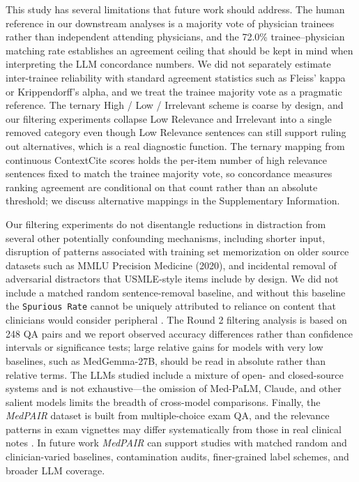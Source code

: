 \documentclass[fleqn,10pt]{wlscirep}
\def\ourmetric{\texttt{Spurious Rate}\xspace}
\begin{document}
This study has several limitations that future work should address. The human reference in our downstream analyses is a majority vote of physician trainees rather than independent attending physicians, and the 72.0\% trainee--physician matching rate establishes an agreement ceiling that should be kept in mind when interpreting the LLM concordance numbers. We did not separately estimate inter-trainee reliability with standard agreement statistics such as Fleiss' kappa or Krippendorff's alpha, and we treat the trainee majority vote as a pragmatic reference. The ternary High / Low / Irrelevant scheme is coarse by design, and our filtering experiments collapse Low Relevance and Irrelevant into a single removed category even though Low Relevance sentences can still support ruling out alternatives, which is a real diagnostic function. The ternary mapping from continuous ContextCite scores holds the per-item number of high relevance sentences fixed to match the trainee majority vote, so concordance measures ranking agreement are conditional on that count rather than an absolute threshold; we discuss alternative mappings in the Supplementary Information.

Our filtering experiments do not disentangle reductions in distraction from several other potentially confounding mechanisms, including shorter input, disruption of patterns associated with training set memorization on older source datasets such as MMLU Precision Medicine (2020), and incidental removal of adversarial distractors that USMLE-style items include by design. We did not include a matched random sentence-removal baseline, and without this baseline the \ourmetric cannot be uniquely attributed to reliance on content that clinicians would consider peripheral \cite{gu_survey_2025, panickssery_llm_2024, radevski2025synthesizing, zuccon2023chatgpt}. The Round 2 filtering analysis is based on 248 QA pairs and we report observed accuracy differences rather than confidence intervals or significance tests; large relative gains for models with very low baselines, such as MedGemma-27B, should be read in absolute rather than relative terms. The LLMs studied include a mixture of open- and closed-source systems and is not exhaustive---the omission of Med-PaLM, Claude, and other salient models limits the breadth of cross-model comparisons. Finally, the \emph{MedPAIR} dataset is built from multiple-choice exam QA, and the relevance patterns in exam vignettes may differ systematically from those in real clinical notes \cite{croxford_current_2025, sharma_relevance_2017}. In future work \emph{MedPAIR} can support studies with matched random and clinician-varied baselines, contamination audits, finer-grained label schemes, and broader LLM coverage.
\end{document}
